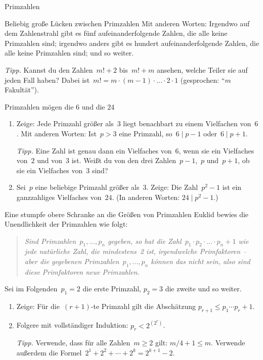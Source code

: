 \documentclass{uebblatt}
\begin{document}
\begin{blatt}{Primzahlen}
\begin{aufgabe}{Beliebig große Lücken zwischen Primzahlen}
Mit anderen Worten: Irgendwo auf dem Zahlenstrahl gibt es fünf
aufeinanderfolgende Zahlen, die alle keine Primzahlen sind; irgendwo anders
gibt es hundert aufeinanderfolgende Zahlen, die alle keine Primzahlen sind; und
so weiter.

{\scriptsize\emph{Tipp.} Kannst du den Zahlen~$m! + 2$ bis~$m! + m$ ansehen, welche Teiler
sie auf jeden Fall haben? Dabei ist~$m! = m \cdot (m-1) \cdot \ldots
\cdot 2 \cdot 1$ (gesprochen: "`$m$ Fakultät"').\par}
\end{aufgabe}

\begin{aufgabe}{Primzahlen mögen die 6 und die 24}
\begin{enumerate}
\item Zeige: Jede Primzahl größer als~$3$ liegt benachbart zu einem Vielfachen
von~$6$. Mit anderen Worten: Ist~$p > 3$ eine Primzahl, so~$6 \mid p - 1$
oder~$6 \mid p + 1$.

{\scriptsize\emph{Tipp.} Eine Zahl ist genau dann ein Vielfaches von~$6$, wenn sie ein
Vielfaches von~$2$ und von~$3$ ist. Weißt du von den drei Zahlen~$p-1$,~$p$
und~$p+1$, ob sie ein Vielfaches von~$3$ sind?\par}

\item Sei~$p$ eine beliebige Primzahl größer als~$3$.
Zeige: Die Zahl~$p^2 - 1$ ist ein ganzzahliges Vielfaches von~$24$.
(In anderen Worten: $24 \mid p^2 - 1$.)
\end{enumerate}
\end{aufgabe}

\begin{aufgabe}{Eine stumpfe obere Schranke an die Größen von Primzahlen}
Euklid bewies die Unendlichkeit der Primzahlen wie folgt:
\begin{quote}
\emph{Sind Primzahlen~$p_1,\ldots,p_n$ gegeben, so hat die Zahl~$p_1 \cdot p_2 \cdot \ldots \cdot p_n
+ 1$ wie jede natürliche Zahl, die mindestens~2 ist, irgendwelche Primfaktoren
-- aber die gegebenen Primzahlen~$p_1,\ldots,p_n$ können das nicht sein, also
sind diese Primfaktoren neue Primzahlen.}
\end{quote}
Sei im Folgenden~$p_1 = 2$ die erste Primzahl, $p_2 = 3$ die zweite und so
weiter.
\begin{enumerate}
\item Zeige: Für die~$(r+1)$-te Primzahl gilt die Abschätzung
$p_{r+1} \leq p_1 \cdots p_r + 1$.
\item Folgere mit vollständiger Induktion: $p_r < 2^{(2^r)}$.

{\scriptsize\emph{Tipp.} Verwende, dass für alle Zahlen~$m \geq 2$ gilt: $m/4 +
1 \leq m$. Verwende außerdem die Formel~$2^1 + 2^2 + \cdots + 2^k = 2^{k+1} -
2$.\par}
\end{enumerate}
\end{aufgabe}

\end{blatt}
\end{document}
